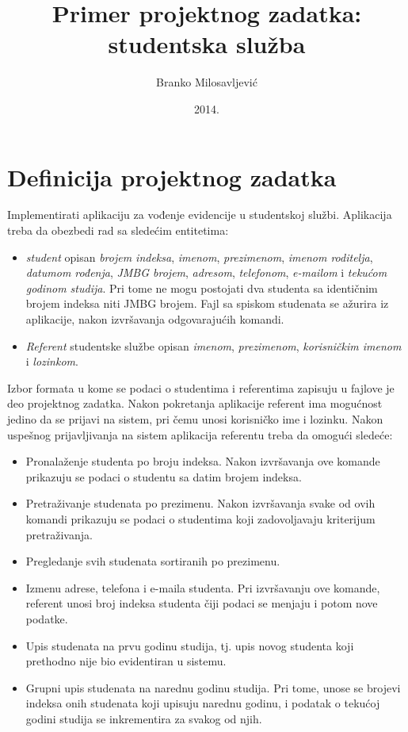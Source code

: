 \documentclass[a4paper]{article}
\title{Primer projektnog zadatka: studentska služba}
\date{2014.}
\author{Branko Milosavljević}
\begin{document}
\maketitle

\section{Definicija projektnog zadatka}

Implementirati aplikaciju za vođenje evidencije u studentskoj službi. Aplikacija
treba da obezbedi rad sa sledećim entitetima:

\begin{itemize}
  \item \textit{student} opisan \textit{brojem indeksa}, \textit{imenom},
  \textit{prezimenom}, \textit{imenom roditelja},
  \textit{datumom rođenja}, \textit{JMBG brojem}, \textit{adresom},
  \textit{telefonom}, \textit{e-mailom} i \textit{tekućom godinom studija}. Pri
  tome ne mogu postojati dva studenta sa identičnim brojem indeksa niti JMBG
  brojem. Fajl sa spiskom studenata se ažurira iz aplikacije, nakon izvršavanja
  odgovarajućih komandi.

  \item \textit{Referent} studentske službe opisan \textit{imenom},
  \textit{prezimenom}, \textit{korisničkim imenom} i \textit{lozinkom}.
\end{itemize}

Izbor formata u kome se podaci o studentima i referentima zapisuju u fajlove je
deo projektnog zadatka. Nakon pokretanja aplikacije referent ima mogućnost
jedino da se prijavi na sistem, pri čemu unosi korisničko ime i lozinku. Nakon
uspešnog prijavljivanja na sistem aplikacija referentu treba da omogući sledeće:

\begin{itemize}
  \item Pronalaženje studenta po broju indeksa. Nakon izvršavanja ove komande
  prikazuju se podaci o studentu sa datim brojem indeksa.

  \item Pretraživanje studenata po prezimenu. Nakon izvršavanja svake od ovih
  komandi prikazuju se podaci o studentima koji zadovoljavaju kriterijum
  pretraživanja.

  \item Pregledanje svih studenata sortiranih po prezimenu.

  \item Izmenu adrese, telefona i e-maila studenta. Pri izvršavanju ove komande,
  referent unosi broj indeksa studenta čiji podaci se menjaju i potom nove 
  podatke.
  
  \item Upis studenata na prvu godinu studija, tj. upis novog studenta koji 
  prethodno nije bio evidentiran u sistemu.
  
  \item Grupni upis studenata na narednu godinu studija. Pri tome, unose se
  brojevi indeksa onih studenata koji upisuju narednu godinu, i podatak o
tekućoj
  godini studija se inkrementira za svakog od njih.
  
\end{itemize}
\end{document}
